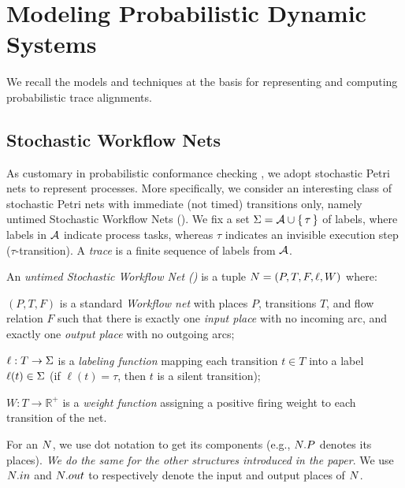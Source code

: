 \section{Modeling Probabilistic Dynamic Systems}
\label{sec:pns}
We recall the models and techniques at the basis for representing and computing probabilistic trace alignments.

\subsection{Stochastic Workflow Nets}\label{subsec:spn}
As customary in probabilistic conformance checking \cite{DBLP:conf/bpm/LeemansSA19,DBLP:conf/icpm/PolyvyanyyK19,DBLP:journals/tosem/PolyvyanyySWCM20}, we adopt stochastic Petri nets \cite{MarsanCB84,RoggeSoltiAW13} to represent processes. More specifically, we consider an interesting class of stochastic Petri nets with immediate (not timed) transitions only, namely untimed Stochastic Workflow Nets ().
We fix a set $\Sigma = \mathcal{A} \cup \set{\tau}$ of labels, where labels in $\mathcal{A}$ indicate process tasks, whereas $\tau$ indicates an invisible execution step ($\tau$-transition). A \emph{trace} is a finite sequence of labels from $\mathcal{A}$.

\begin{definition} An \emph{untimed Stochastic Workflow Net (\uswn)}
is a tuple $N = (P,T,F,\ell,W)$ where:
\begin{inparaenum}[\itshape (i)]
\item $(P,T,F)$ is a standard \emph{Workflow net} with places $P$, transitions $T$, and flow relation $F$ such that there is exactly one \emph{input place} with no incoming arc, and exactly one \emph{output place} with no outgoing arcs;
\item $\ell: T \rightarrow \Sigma$ is a \emph{labeling function} mapping each transition $t \in T$ into a label $\ell(t) \in \Sigma$ (if $\ell(t) = \tau$, then $t$ is a silent transition);
\item $W\colon T\to \mathbb{R}^+$ is a \emph{weight function} assigning a positive firing weight to each transition of the net.
\end{inparaenum}
\end{definition}
For an \uswn $N$, we use dot notation to get its  components (e.g., $N.P$ denotes its places). \emph{We do the same for the other structures introduced in the paper}. We use $N.in$ and $N.out$ to respectively denote the input and output places of $N$.

